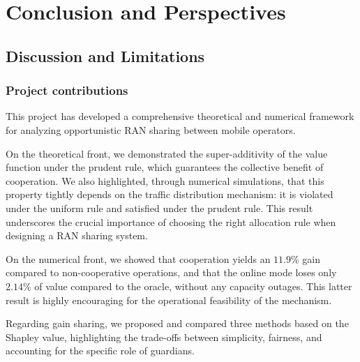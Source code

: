 \newpage
\section{Conclusion and Perspectives}

\subsection{Discussion and Limitations}

\subsubsection{Project contributions}
This project has developed a comprehensive theoretical and numerical framework for analyzing opportunistic RAN sharing between mobile operators.

On the theoretical front, we demonstrated the super-additivity of the value function under the prudent rule, which guarantees the collective benefit of cooperation. We also highlighted, through numerical simulations, that this property tightly depends on the traffic distribution mechanism: it is violated under the uniform rule and satisfied under the prudent rule. This result underscores the crucial importance of choosing the right allocation rule when designing a RAN sharing system.

On the numerical front, we showed that cooperation yields an $11.9\%$ gain compared to non-cooperative operations, and that the online mode loses only $2.14\%$ of value compared to the oracle, without any capacity outages. This latter result is highly encouraging for the operational feasibility of the mechanism.

Regarding gain sharing, we proposed and compared three methods based on the Shapley value, highlighting the trade-offs between simplicity, fairness, and accounting for the specific role of guardians.

